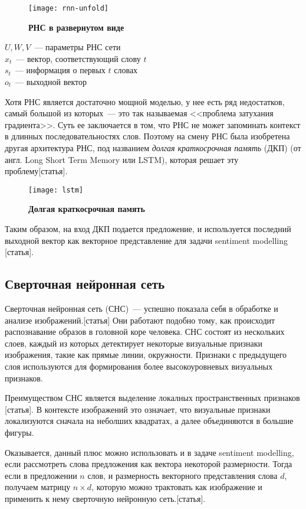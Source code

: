\begin{figure}[h]
\texttt{[image: rnn-unfold]}
\caption{\textbf{РНС в развернутом виде}}
\label{fig:rnn-unfold}
\end{figure}

\noindent $U, W, V$~--- параметры РНС сети\\
$x_t$~--- вектор, соответствующий слову $t$ \\
$s_t$~--- информация о первых $t$ словах \\
$o_t$~--- выходной вектор

Хотя РНС является достаточно мощной моделью, у нее есть ряд недостатков, самый большой из которых~--- это так называемая <<проблема затухания градиента>>. Суть ее заключается в том, что РНС не может запоминать контекст в длинных последовательностях слов. Поэтому на смену РНС была изобретена другая архитектура РНС, под названием \emph{долгая краткосрочная память} (ДКП) (от англ. Long Short Term Memory или LSTM), которая решает эту проблему[статья].

\begin{figure}[h]
\texttt{[image: lstm]}
\caption{\textbf{Долгая краткосрочная память}}
\label{fig:lstm}
\end{figure}

Таким образом, на вход ДКП подается предложение, и используется последний выходной вектор как векторное представление для задачи sentiment modelling [статья].

\subsection{Сверточная нейронная сеть}
Сверточная нейронная сеть (СНС)~--- успешно показала себя в обработке и анализе изображений.[статья] Они работают подобно тому, как происходит распознавание образов в головной коре человека. СНС состоят из нескольких слоев, каждый из которых детектирует некоторые визуальные признаки изображения, такие как прямые линии, окружности. Признаки с предыдущего слоя используются для формирования более высокоуровневых визуальных признаков.

Преимуществом СНС является выделение локалных пространственных признаков [статья]. В контексте изображений это означает, что визуальные признаки локализуются сначала на неболших квадратах, а далее объединяются в большие фигуры.

Оказывается, данный плюс можно использовать и в задаче sentiment modelling, если рассмотреть слова предложения как вектора некоторой размерности. Тогда если в предложении $n$ слов, 
и размерность векторного представления слова $d$, получаем матрицу $n \times d$, 
которую можно трактовать как изображение и применить к нему сверточную нейронную сеть.[статья].

